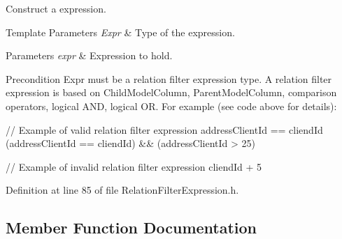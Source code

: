 Construct a expression. 


\begin{DoxyTemplParams}{Template Parameters}
{\em Expr} & Type of the expression. \\
\hline
\end{DoxyTemplParams}

\begin{DoxyParams}{Parameters}
{\em expr} & Expression to hold. \\
\hline
\end{DoxyParams}
\begin{DoxyPrecond}{Precondition}
Expr must be a relation filter expression type. A relation filter expression is based on Child\+Model\+Column, Parent\+Model\+Column, comparison operators, logical A\+ND, logical OR. For example (see code above for details)\+: 
\begin{DoxyCode}
\textcolor{comment}{// Example of valid relation filter expression}
addressClientId == cliendId
(addressClientId == cliendId) && (addressClientId > 25)

\textcolor{comment}{// Example of invalid relation filter expression}
cliendId + 5
\end{DoxyCode}
 
\end{DoxyPrecond}


Definition at line 85 of file Relation\+Filter\+Expression.\+h.



\subsection{Member Function Documentation}
